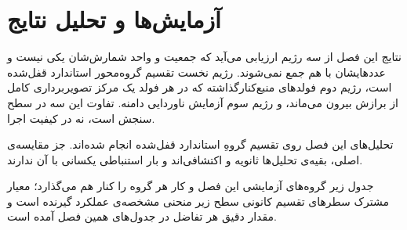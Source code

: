 \clearpage
\section{آزمایش‌ها و تحلیل نتایج}

نتایج این فصل از سه رژیم ارزیابی می‌آید که جمعیت و واحد شمارش‌شان یکی نیست و عددهایشان با هم جمع نمی‌شوند. رژیم نخست تقسیم گروه‌محور استاندارد قفل‌شده است، رژیم دوم فولدهای منبع‌کنارگذاشته که در هر فولد یک مرکز تصویربرداری کامل از برازش بیرون می‌ماند، و رژیم سوم آزمایش ناوردایی دامنه. تفاوت این سه در سطح سنجش است، نه در کیفیت اجرا.

تحلیل‌های این فصل روی تقسیم گروهِ استاندارد قفل‌شده انجام شده‌اند. جز مقایسه‌ی اصلی، بقیه‌ی تحلیل‌ها ثانویه و اکتشافی‌اند و بار استنباطی یکسانی با آن ندارند.

جدول زیر گروه‌های آزمایشی این فصل و کار هر گروه را کنار هم می‌گذارد؛ معیار مشترک سطرهای تقسیم کانونی سطح زیر منحنی مشخصه‌ی عملکرد گیرنده است و مقدار دقیق هر تفاضل در جدول‌های همین فصل آمده است.

